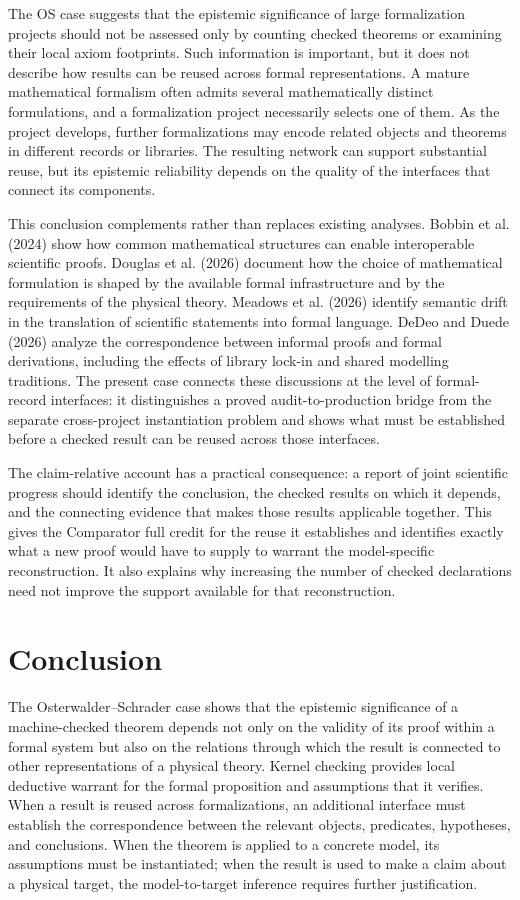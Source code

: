\documentclass[pdflatex,sn-apa]{sn-jnl}
\begin{document}
The OS case suggests that the epistemic significance of large formalization projects should not be assessed only by counting checked theorems or examining their local axiom footprints. Such information is important, but it does not describe how results can be reused across formal representations. A mature mathematical formalism often admits several mathematically distinct formulations, and a formalization project necessarily selects one of them. As the project develops, further formalizations may encode related objects and theorems in different records or libraries. The resulting network can support substantial reuse, but its epistemic reliability depends on the quality of the interfaces that connect its components.

This conclusion complements rather than replaces existing analyses. Bobbin et al. (2024) show how common mathematical structures can enable interoperable scientific proofs. Douglas et al. (2026) document how the choice of mathematical formulation is shaped by the available formal infrastructure and by the requirements of the physical theory. Meadows et al. (2026) identify semantic drift in the translation of scientific statements into formal language. DeDeo and Duede (2026) analyze the correspondence between informal proofs and formal derivations, including the effects of library lock-in and shared modelling traditions. The present case connects these discussions at the level of formal-record interfaces: it distinguishes a proved audit-to-production bridge from the separate cross-project instantiation problem and shows what must be established before a checked result can be reused across those interfaces.

The claim-relative account has a practical consequence: a report of joint scientific progress should identify the conclusion, the checked results on which it depends, and the connecting evidence that makes those results applicable together. This gives the Comparator full credit for the reuse it establishes and identifies exactly what a new proof would have to supply to warrant the model-specific reconstruction. It also explains why increasing the number of checked declarations need not improve the support available for that reconstruction.

\section{Conclusion}

The Osterwalder--Schrader case shows that the epistemic significance of a machine-checked theorem depends not only on the validity of its proof within a formal system but also on the relations through which the result is connected to other representations of a physical theory. Kernel checking provides local deductive warrant for the formal proposition and assumptions that it verifies. When a result is reused across formalizations, an additional interface must establish the correspondence between the relevant objects, predicates, hypotheses, and conclusions. When the theorem is applied to a concrete model, its assumptions must be instantiated; when the result is used to make a claim about a physical target, the model-to-target inference requires further justification.
\end{document}
